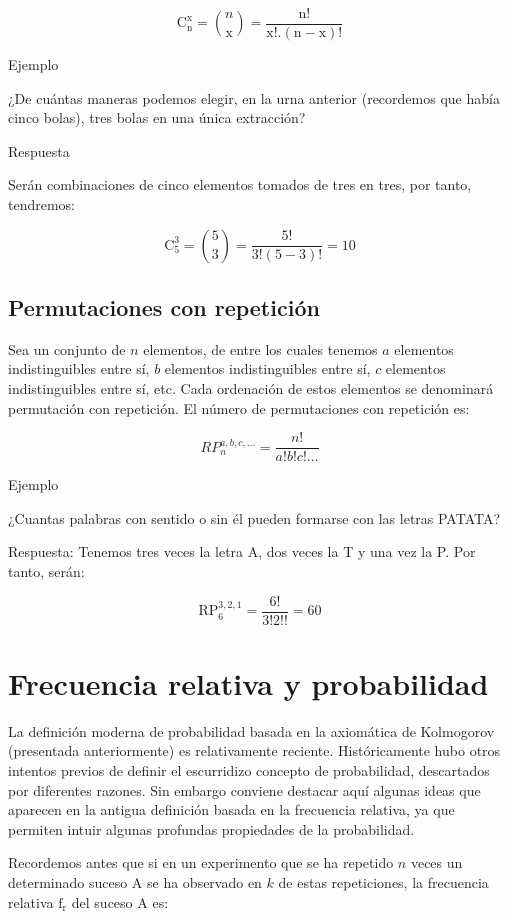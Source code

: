 \documentclass[
  a4paper,
  DIV=11,
  numbers=noendperiod]{scrreprt}
\begin{document}
\[
\mathrm{C}_{\mathrm{n}}^{\mathrm{x}}=\binom{n}{\mathrm{x}}=\frac{\mathrm{n!}}{\mathrm{x}!.(\mathrm{n}-\mathrm{x})!}
\]

Ejemplo

¿De cuántas maneras podemos elegir, en la urna anterior (recordemos que
había cinco bolas), tres bolas en una única extracción?

Respuesta

Serán combinaciones de cinco elementos tomados de tres en tres, por
tanto, tendremos:

\[
\mathrm{C}_{5}^{3}=\binom{5}{3}=\frac{5!}{3!(5-3)!}=10
\]

\subsection{Permutaciones con
repetición}\label{permutaciones-con-repeticiuxf3n}

Sea un conjunto de \(n\) elementos, de entre los cuales tenemos \(a\)
elementos indistinguibles entre sí, \(b\) elementos indistinguibles
entre sí, \(c\) elementos indistinguibles entre sí, etc. Cada ordenación
de estos elementos se denominará permutación con repetición. El número
de permutaciones con repetición es:

\[
R P{ }_{n}^{a, b, c, \ldots}=\frac{n!}{a!b!c!\ldots}
\]

Ejemplo

¿Cuantas palabras con sentido o sin él pueden formarse con las letras
PATATA?

Respuesta: Tenemos tres veces la letra A, dos veces la T y una vez la P.
Por tanto, serán:

\[
\mathrm{RP}_{6}^{3,2,1}=\frac{6!}{3!2!!}=60
\]

\section{Frecuencia relativa y
probabilidad}\label{frecuencia-relativa-y-probabilidad}

La definición moderna de probabilidad basada en la axiomática de
Kolmogorov (presentada anteriormente) es relativamente reciente.
Históricamente hubo otros intentos previos de definir el escurridizo
concepto de probabilidad, descartados por diferentes razones. Sin
embargo conviene destacar aquí algunas ideas que aparecen en la antigua
definición basada en la frecuencia relativa, ya que permiten intuir
algunas profundas propiedades de la probabilidad.

Recordemos antes que si en un experimento que se ha repetido \(n\) veces
un determinado suceso A se ha observado en \(k\) de estas repeticiones,
la frecuencia relativa \(\mathrm{f}_{\mathrm{r}}\) del suceso A es:
\end{document}

